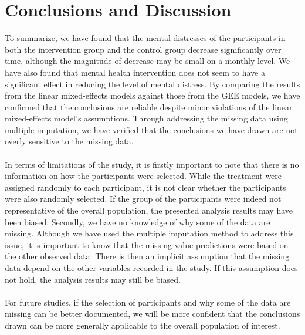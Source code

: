 \section{Conclusions and Discussion}
To summarize, we have found that the mental distresses of the participants in both the intervention group and the control group decrease significantly over time, although the magnitude of decrease may be small on a monthly level. We have also found that mental health intervention does not seem to have a significant effect in reducing the level of mental distress. By comparing the results from the linear mixed-effects models against those from the GEE models, we have confirmed that the conclusions are reliable despite minor violations of the linear mixed-effects model's assumptions. Through addressing the missing data using multiple imputation, we have verified that the conclusions we have drawn are not overly sensitive to the missing data.\\\\
In terms of limitations of the study, it is firstly important to note that there is no information on how the participants were selected. While the treatment were assigned randomly to each participant, it is not clear whether the participants were also randomly selected. If the group of the participants were indeed not representative of the overall population, the presented analysis results may have been biased. Secondly, we have no knowledge of why some of the data are missing. Although we have used the multiple imputation method to address this issue, it is important to know that the missing value predictions were based on the other observed data. There is then an implicit assumption that the missing data depend on the other variables recorded in the study. If this assumption does not hold, the analysis results may still be biased.\\\\
For future studies, if the selection of participants and why some of the data are missing can be better documented, we will be more confident that the conclusions drawn can be more generally applicable to the overall population of interest.